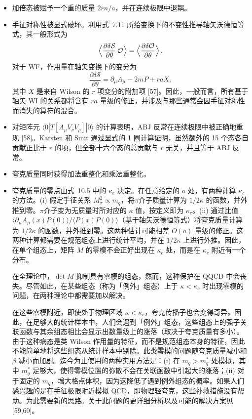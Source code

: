 \begin{itemize}
\item 加倍态被赋予一个重的质量 $2 r n /a$，并在连续极限中退耦。

\item 手征对称性被显式破坏。利用式~7.11 所给变换下的不变性推导轴矢沃德恒等式，其一般形式为
\begin{equation}
\Bigl\langle \frac{\partial \delta\mathcal{S}}{\partial \theta}\,\mathcal{O} \Bigr\rangle = \Bigl\langle \frac{\partial \delta\mathcal{O}}{\partial \theta} \Bigr\rangle \,.
\end{equation}
对于 WF，作用量在轴矢变换下的变分为
\begin{equation}
\frac{\partial \delta\mathcal{S}}{\partial \theta} = \partial_\mu A_\mu - 2 m P + r a X,
\end{equation}
其中 $X$ 是来自 Wilson 的 $r$ 项变分的附加项 [57]。因此，一般而言，所有基于轴矢 WI 的关系都将含有 $ra$ 量级的修正，并涉及与那些通常会因手征对称性而消失的算符的混合。

\item 对矩阵元 $\langle 0| T[A_\mu V_\nu V_\rho] |0\rangle$ 的计算表明，ABJ 反常在连续极限中被正确地重现 [58]。Karsten 和 Smit 通过显式的 1 圈计算证明，虽然额外的 15 个态各自贡献正比于 $r$ 的项，但全部十六个态的总贡献与 $r$ 无关，并且等于 ABJ 反常。

\item 夸克质量同时获得加法重整化和乘法重整化。

\item 夸克质量的零点由式~10.5 中的 $\kappa_c$ 决定。在任意给定的 $a$ 处，有两种计算 $\kappa_c$ 的方法。(i) 假定手征关系 $M_\pi^2 \propto m_q$，将$\pi$介子质量计算为 $1/2\kappa$ 的函数，并外推到零。$\pi$介子变为无质量时所对应的 $\kappa$ 值，按定义即为 $\kappa_c$。(ii) 通过比值 $\langle \partial_\mu A_\mu(x) P(0)\rangle / \langle P(x) P(0)\rangle$（基于轴矢沃德恒等式）将夸克质量计算为 $1/2\kappa$ 的函数，并外推到零。这两种估计可能相差 $O(a)$ 量级的修正。这两种计算都需要在规范组态上进行统计平均，并在 $1/2\kappa$ 上进行外推。因此，在单个组态上，矩阵 $M$ 的零模不会正好出现在 $\kappa_c$ 处，而是在 $\kappa_c$ 附近有一个分布。

在全理论中，$\det M$ 抑制具有零模的组态，然而，这种保护在 QQCD 中会丧失。尽管如此，在某些组态（称为「例外」组态）上于 $\kappa < \kappa_c$ 时出现零模的问题，在两种理论中都需要加以解决。

在这些零模附近，即使处于物理区域 $\kappa < \kappa_c$，夸克传播子也会变得奇异。因此，在足够大的统计样本中，人们会遇到「例外」组态，这些组态上的强子关联函数与其余组态相比会显示出数量级上的涨落（取决于夸克质量有多小）。由于这种病态是类 Wilson 作用量的特征，而不是规范组态本身的特征，因此不能简单地将这些组态从统计样本中剔除。此类零模的问题随夸克质量减小和 $\beta$ 减小而加剧。迄今为止使用的两种实用方法是：(i) 在 $m_q > m_q^{*}$ 处模拟，其中 $m_q^{*}$ 足够大，使得零模位置的弥散不会在关联函数中引起大的涨落；(ii) 对于固定的 $m_q$，增大格点体积，因为这降低了遇到例外组态的概率。如果人们感兴趣的是在手征极限附近模拟 QCD，即物理轻夸克，这些补救措施没有帮助。为此需要新的思路。关于此问题的更详细分析以及可能的解决方案见 [59,60]。


\end{itemize}
